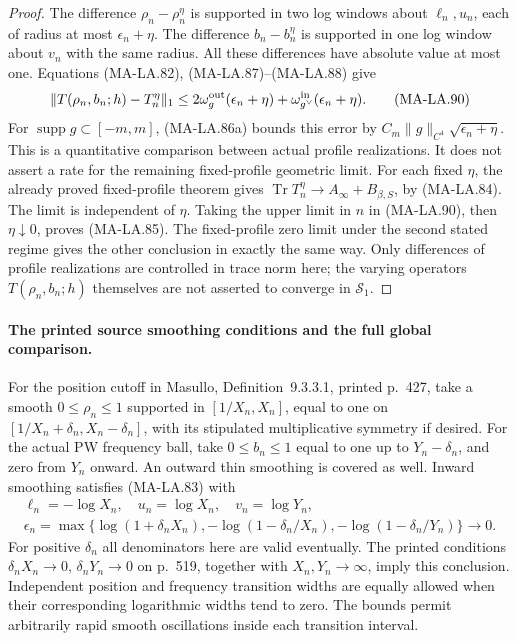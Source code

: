 \begin{proof}
The difference \(\rho_n-\rho_n^\eta\) is supported
in two log windows about \(\ell_n,u_n\), each of
radius at most \(\epsilon_n+\eta\).
The difference \(b_n-b_n^\eta\) is supported in one
log window about \(v_n\) with the same radius.
All these differences have absolute value at most one.
Equations (MA-LA.82), (MA-LA.87)--(MA-LA.88) give
\[
 \|T(\rho_n,b_n;h)-T_n^\eta\|_1
   \le2\omega_g^{\rm out}(\epsilon_n+\eta)
               +\omega_{g^\vee}^{\rm in}(\epsilon_n+\eta).
 \tag{MA-LA.90}
\]
For \(\operatorname{supp}g\subset[-m,m]\), (MA-LA.86a)
bounds this error by
\(C_m\|g\|_{C^4}\sqrt{\epsilon_n+\eta}\).
This is a quantitative comparison between actual profile
realizations.  It does not assert a rate for the remaining
fixed-profile geometric limit.
For each fixed \(\eta\), the already proved fixed-profile
theorem gives \(\operatorname{Tr}T_n^\eta\to
A_\infty+B_{\beta,S}\), by (MA-LA.84).
The limit is independent of \(\eta\).
Taking the upper limit in \(n\) in (MA-LA.90), then
\(\eta\downarrow0\), proves (MA-LA.85).
The fixed-profile zero limit under the second stated
regime gives the other conclusion in exactly the same
way.  Only differences of profile realizations are
controlled in trace norm here; the varying operators
\(T(\rho_n,b_n;h)\) themselves are not asserted to
converge in \(\mathcal S_1\).
\end{proof}

\paragraph{The printed source smoothing conditions and the full global comparison.}
For the position cutoff in Masullo, Definition~9.3.3.1,
printed p.~427, take a smooth \(0\le\rho_n\le1\) supported
in \([1/X_n,X_n]\), equal to one on
\([1/X_n+\delta_n,X_n-\delta_n]\), with its stipulated
multiplicative symmetry if desired.
For the actual PW frequency ball, take \(0\le b_n\le1\)
equal to one up to \(Y_n-\delta_n\), and zero from
\(Y_n\) onward.  An outward thin smoothing is covered
as well.  Inward smoothing satisfies (MA-LA.83) with
\[
 \begin{gathered}
 \ell_n=-\log X_n,\quad u_n=\log X_n,\quad v_n=\log Y_n,\\
 \epsilon_n=
 \max\{\log(1+\delta_nX_n),
             -\log(1-\delta_n/X_n),
             -\log(1-\delta_n/Y_n)\}\longrightarrow0 .
 \end{gathered}
 \tag{MA-LA.91}
\]
For positive \(\delta_n\) all denominators here are valid
eventually.  The printed conditions
\(\delta_nX_n\to0\), \(\delta_nY_n\to0\) on p.~519,
together with \(X_n,Y_n\to\infty\), imply this conclusion.
Independent position and frequency transition widths
are equally allowed when their corresponding logarithmic
widths tend to zero.
The bounds permit arbitrarily rapid smooth oscillations
inside each transition interval.

